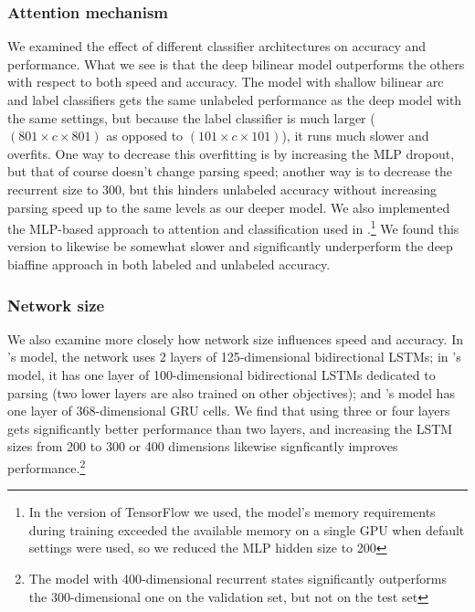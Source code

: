 \documentclass[11pt,a4paper]{article}
\begin{document}
\subsubsection{Attention mechanism}
We examined the effect of different classifier architectures on accuracy and performance. What we see is that the deep bilinear model outperforms the others with respect to both speed and accuracy. The model with shallow bilinear arc and label classifiers gets the same unlabeled performance as the deep model with the same settings, but because the label classifier is much larger ($(801 \times c \times 801)$ as opposed to $(101 \times c \times 101)$), it runs much slower and overfits. One way to decrease this overfitting is by increasing the MLP dropout, but that of course doesn't change parsing speed; another way is to decrease the recurrent size to 300, but this hinders unlabeled accuracy without increasing parsing speed up to the same levels as our deeper model. We also implemented the MLP-based approach to attention and classification used in \citet{KiperwasserGoldberg2016}.\footnote{In the version of TensorFlow we used, the model's memory requirements during training exceeded the available memory on a single GPU when default settings were used, so we reduced the MLP hidden size to 200} We found this version to likewise be somewhat slower and significantly underperform the deep biaffine approach in both labeled and unlabeled accuracy.

\subsubsection{Network size}
We also examine more closely how network size influences speed and accuracy. In \citeauthor{KiperwasserGoldberg2016}'s \citeyear{KiperwasserGoldberg2016} model, the network uses 2 layers of 125-dimensional bidirectional LSTMs; in \citeauthor{Hashimotoetal2016}'s \citeyear{Hashimotoetal2016} model, it has one layer of 100-dimensional bidirectional LSTMs dedicated to parsing (two lower layers are also trained on other objectives); and \citeauthor{Chengetal2016}'s \citeyear{Chengetal2016} model has one layer of 368-dimensional GRU cells. We find that using three or four layers gets significantly better performance than two layers, and increasing the LSTM sizes from 200 to 300 or 400 dimensions likewise signficantly improves performance.\footnote{The model with 400-dimensional recurrent states significantly outperforms the 300-dimensional one on the validation set, but not on the test set}
\end{document}

